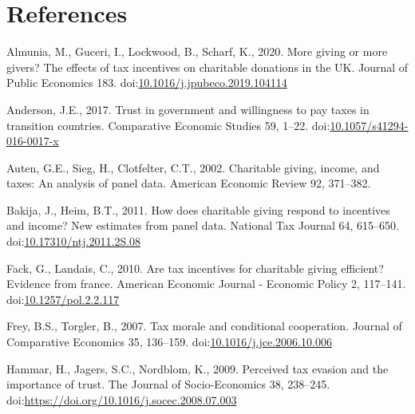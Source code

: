 \documentclass[ review  , 3p ]{elsarticle}
\newlength{\cslhangindent}
\newenvironment{CSLReferences}[2] %
 {%
  \setlength{\parindent}{0pt}
  \ifodd #1 \everypar{\setlength{\hangindent}{\cslhangindent}}\ignorespaces\fi
  \ifnum #2 > 0
  \setlength{\parskip}{#2\baselineskip}
  \fi
 }%
 {}
\begin{document}
  \clearpage

  \hypertarget{references}{%
  \section*{References}\label{references}}

  \hypertarget{refs}{}
  \begin{CSLReferences}{1}{0}
  \leavevmode{}%
  Almunia, M., Guceri, I., Lockwood, B., Scharf, K., 2020. More giving or more givers? The effects of tax incentives on charitable donations in the UK. Journal of Public Economics 183. doi:\href{https://doi.org/10.1016/j.jpubeco.2019.104114}{10.1016/j.jpubeco.2019.104114}

  \leavevmode{}%
  Anderson, J.E., 2017. Trust in government and willingness to pay taxes in transition countries. Comparative Economic Studies 59, 1--22. doi:\href{https://doi.org/10.1057/s41294-016-0017-x}{10.1057/s41294-016-0017-x}

  \leavevmode{}%
  Auten, G.E., Sieg, H., Clotfelter, C.T., 2002. Charitable giving, income, and taxes: An analysis of panel data. American Economic Review 92, 371--382.

  \leavevmode{}%
  Bakija, J., Heim, B.T., 2011. How does charitable giving respond to incentives and income? New estimates from panel data. National Tax Journal 64, 615--650. doi:\href{https://doi.org/10.17310/ntj.2011.2S.08}{10.17310/ntj.2011.2S.08}

  \leavevmode{}%
  Fack, G., Landais, C., 2010. Are tax incentives for charitable giving efficient? Evidence from france. American Economic Journal - Economic Policy 2, 117--141. doi:\href{https://doi.org/10.1257/pol.2.2.117}{10.1257/pol.2.2.117}

  \leavevmode{}%
  Frey, B.S., Torgler, B., 2007. Tax morale and conditional cooperation. Journal of Comparative Economics 35, 136--159. doi:\href{https://doi.org/10.1016/j.jce.2006.10.006}{10.1016/j.jce.2006.10.006}

  \leavevmode{}%
  Hammar, H., Jagers, S.C., Nordblom, K., 2009. Perceived tax evasion and the importance of trust. The Journal of Socio-Economics 38, 238--245. doi:\url{https://doi.org/10.1016/j.socec.2008.07.003}


\end{CSLReferences}
\end{document}
